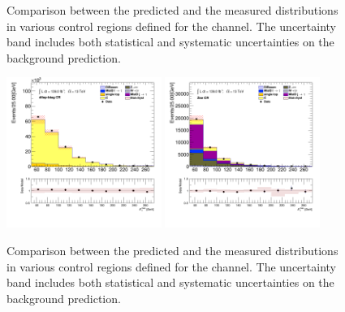 \begin{figure}[!thp]
\begin{center}
			\end{center}
			\caption{
			Comparison between the predicted and the measured \Etm distributions in various control regions defined for the \taulep channel. The uncertainty band includes both statistical and systematic uncertainties on the background prediction. 
			}
			\label{fig:bkg-met-taulep-1}
		\end{figure}

		\begin{figure}[!thp]
			\begin{center}    
			\includegraphics[width=0.45\textwidth]{chapters/chapter6_HPlus/images/taulep/met_et_DILEP_BTAG.png}
			\includegraphics[width=0.45\textwidth]{chapters/chapter6_HPlus/images/taulep/met_et_ZEE.png} \\
			\end{center}
			\caption{
			Comparison between the predicted and the measured \Etm distributions in various control regions defined for the \taulep channel. The uncertainty band includes both statistical and systematic uncertainties on the background prediction. 
			}
			\label{fig:bkg-met-taulep-2}
		\end{figure}

